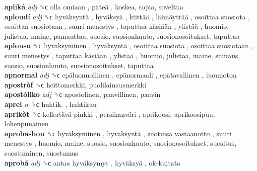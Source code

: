 \textbf{apliká} \emph{adj}  ␝ϲ   olla omiaan ,  päteä , koskea, sopia, soveltua  \\
\textbf{aploudí} \emph{adj}  ␝ϲ   hyväksyntä ,  hyväksyä ,  kiittää ,  läimäyttää ,  osoittaa suosiota ,  osoittaa suosiotaan ,  suuri menestys ,  taputtaa käsiään ,  ylistää , huomio, julistaa, maine, pamauttaa, suosio, suosionhuuto, suosionosoitukset, taputtaa  \\
\textbf{aplouso} ␝ϲ   hyväksyminen ,  hyväksyntä ,  osoittaa suosiota ,  osoittaa suosiotaan ,  suuri menestys ,  taputtaa käsiään ,  ylistää , huomio, julistaa, maine, siunaus, suosio, suosionhuuto, suosionosoitukset, taputtaa  \\
\textbf{apnormal} \emph{adj}  ␝ϲ   epäluonnollinen ,  epänormaali ,  epätavallinen , luonnoton  \\
\textbf{apostròf} ␝ϲ  heittomerkki, puolilainausmerkki  \\
\textbf{apostóliko} \emph{adj}  ␝ϲ  apostolinen, paavillinen, paavin  \\
\textbf{aprel} \emph{n}  ␝ϲ   huhtik. , huhtikuu  \\
\textbf{aprikòt} ␝ϲ   kellertävä pinkki ,  persikanväri , aprikoosi, aprikoosipuu, lohenpunainen  \\
\textbf{aprobashon} ␝ϲ   hyväksyminen ,  hyväksyntä ,  suotuisa vastaanotto ,  suuri menestys , huomio, maine, suosio, suosionhuuto, suosionosoitukset, suositus, suostuminen, suostumus  \\
\textbf{aprobá} \emph{adj}  ␝ϲ   antaa hyväksymys ,  hyväksyä ,  ok-kuitata   \\
